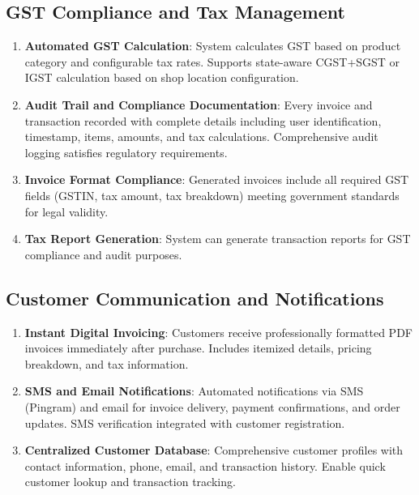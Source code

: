 \documentclass[12pt,a4paper]{report}
\begin{document}
\subsection{GST Compliance and Tax Management}
\begin{enumerate}[label=\roman*)]
    \item \textbf{Automated GST Calculation}: System calculates GST based on product category and configurable tax rates. Supports state-aware CGST+SGST or IGST calculation based on shop location configuration.
    \item \textbf{Audit Trail and Compliance Documentation}: Every invoice and transaction recorded with complete details including user identification, timestamp, items, amounts, and tax calculations. Comprehensive audit logging satisfies regulatory requirements.
    \item \textbf{Invoice Format Compliance}: Generated invoices include all required GST fields (GSTIN, tax amount, tax breakdown) meeting government standards for legal validity.
    \item \textbf{Tax Report Generation}: System can generate transaction reports for GST compliance and audit purposes.
\end{enumerate}

\subsection{Customer Communication and Notifications}
\begin{enumerate}[label=\roman*)]
    \item \textbf{Instant Digital Invoicing}: Customers receive professionally formatted PDF invoices immediately after purchase. Includes itemized details, pricing breakdown, and tax information.
    \item \textbf{SMS and Email Notifications}: Automated notifications via SMS (Pingram) and email for invoice delivery, payment confirmations, and order updates. SMS verification integrated with customer registration.
    \item \textbf{Centralized Customer Database}: Comprehensive customer profiles with contact information, phone, email, and transaction history. Enable quick customer lookup and transaction tracking.
\end{enumerate}
\end{document}
